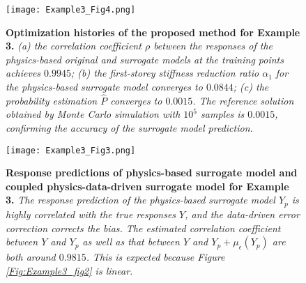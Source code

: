 \documentclass[number,preprint,3p]{elsarticle}
\newcommand{\1}[2]{\mathbb{I}_{#1}\left(#2\right)}
\begin{document}
	\begin{figure}[H]
		\centering
		\texttt{[image: Example3\_Fig4.png]}
		\caption{\textbf{Optimization histories of the proposed method for Example 3.} \textit{(a) the correlation coefficient ${\rho}$ between the responses of the physics-based original and surrogate models at the training points achieves $0.9945$; (b) the first-storey stiffness reduction ratio $\alpha_{1}$ for the physics-based surrogate model converges to $0.0844$; (c) the probability estimation $\hat{P}$ converges to $0.0015$. The reference solution obtained by Monte Carlo simulation with $10^{5}$ samples is $0.0015$, confirming the accuracy of the surrogate model prediction.}}
		\label{Fig:Example3_fig3}
	\end{figure}
	
	\begin{figure}[H]
		\centering
		\texttt{[image: Example3\_Fig3.png]}
		\caption{\textbf{Response predictions of physics-based surrogate model and coupled physics-data-driven surrogate model for Example 3.} \textit{The response prediction of the physics-based surrogate model $Y_p$ is highly correlated with the true responses $Y$, and the data-driven error correction corrects the bias. The estimated correlation coefficient between $Y$ and $Y_{p}$ as well as that between $Y$ and $Y_{p}+\mu_{\epsilon}(Y_{p})$ are both around $0.9815$. This is expected because Figure \ref{Fig:Example3_fig2} is linear}.}
		\label{Fig:Example3_fig4}
	\end{figure}
	
\end{document}
